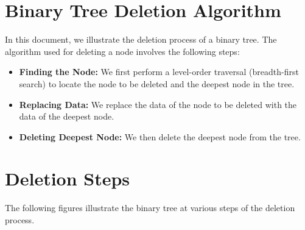 \documentclass[10pt,a4paper]{article}
\begin{document}
\section*{Binary Tree Deletion Algorithm}
In this document, we illustrate the deletion process of a binary tree. The algorithm used for deleting a node involves the following steps:

\begin{itemize}
    \item \textbf{Finding the Node:} We first perform a level-order traversal (breadth-first search) to locate the node to be deleted and the deepest node in the tree.
    \item \textbf{Replacing Data:} We replace the data of the node to be deleted with the data of the deepest node.
    \item \textbf{Deleting Deepest Node:} We then delete the deepest node from the tree.
\end{itemize}

\section*{Deletion Steps}
The following figures illustrate the binary tree at various steps of the deletion process.
\end{document}
